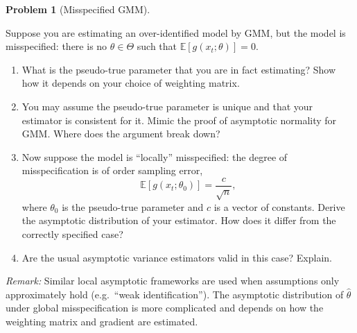 \documentclass[12pt]{article}
\newcommand{\E}{\mathbb E}
\theoremstyle{definition}
\newtheorem{problem}{Problem}
\theoremstyle{plain}
\begin{document}
\begin{problem}[Misspecified GMM]
\label{prob:misspec-gmm}

Suppose you are estimating an over-identified model by GMM, but the model is misspecified: there is no $\theta \in \Theta$ such that $\E[g(x_t; \theta)] = 0$.

\begin{enumerate}[label=(\alph*)]
\item What is the pseudo-true parameter that you are in fact estimating? Show how it depends on your choice of weighting matrix.
\item You may assume the pseudo-true parameter is unique and that your estimator is consistent for it. Mimic the proof of asymptotic normality for GMM. Where does the argument break down?
\item Now suppose the model is ``locally'' misspecified: the degree of misspecification is of order sampling error,
\[
\E[g(x_t; \theta_0)] = \frac{c}{\sqrt{n}},
\]
where $\theta_0$ is the pseudo-true parameter and $c$ is a vector of constants. Derive the asymptotic distribution of your estimator. How does it differ from the correctly specified case?
\item Are the usual asymptotic variance estimators valid in this case? Explain.
\end{enumerate}

\noindent\textit{Remark:} Similar local asymptotic frameworks are used when assumptions only approximately hold (e.g.\ ``weak identification''). The asymptotic distribution of $\hat{\theta}$ under global misspecification is more complicated and depends on how the weighting matrix and gradient are estimated.
\end{problem}

\vspace{0.8em}
\end{document}
